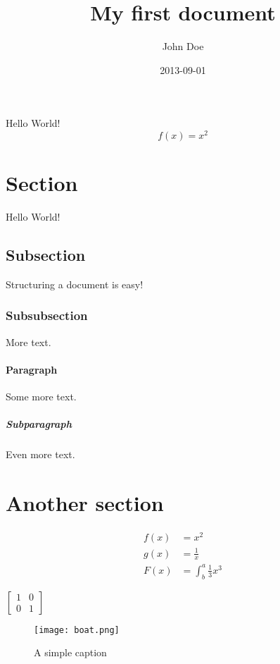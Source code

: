 \documentclass[10pt]{article}
\title{My first document}
\date{2013-09-01}
\author{John Doe}
\begin{document}
  \maketitle
  
    Hello World!
\begin{equation*}
 f(x)=x^2
\end{equation*}


  \newpage
\tableofcontents
\newpage


\section{Section}

Hello World!

\subsection{Subsection}

Structuring a document is easy!

\subsubsection{Subsubsection}

More text.

\paragraph{Paragraph}

Some more text.

\subparagraph{Subparagraph}

Even more text.

\section{Another section}

   \newpage
 
\begin{align*}
  f(x) &= x^2\\
  g(x) &= \frac{1}{x}\\
  F(x) &= \int^a_b \frac{1}{3}x^3
\end{align*}

$\left[
\begin{matrix}
1 & 0\\
0 & 1
\end{matrix}
\right]$

   \newpage
\begin{figure}[ht!]
\centering
\texttt{[image: boat.png]}
\caption{A simple caption \label{overflow}}
\end{figure}
\end{document}
